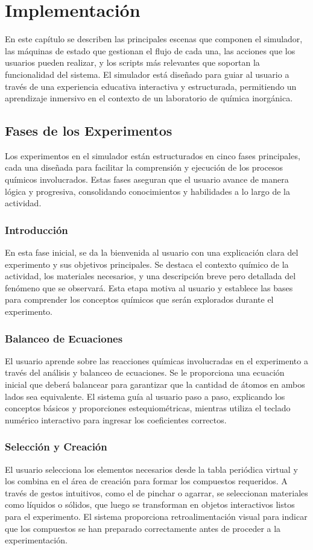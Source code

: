 \chapter{Implementación}\label{ch:Implementación}

En este capítulo se describen las principales escenas que componen el simulador, las máquinas de estado que gestionan el flujo de cada una, las acciones que los usuarios pueden realizar, y los scripts más relevantes que soportan la funcionalidad del sistema. El simulador está diseñado para guiar al usuario a través de una experiencia educativa interactiva y estructurada, permitiendo un aprendizaje inmersivo en el contexto de un laboratorio de química inorgánica.

\section{Fases de los Experimentos}
Los experimentos en el simulador están estructurados en cinco fases principales, cada una diseñada para facilitar la comprensión y ejecución de los procesos químicos involucrados. Estas fases aseguran que el usuario avance de manera lógica y progresiva, consolidando conocimientos y habilidades a lo largo de la actividad.

\subsection{Introducción}
En esta fase inicial, se da la bienvenida al usuario con una explicación clara del experimento y sus objetivos principales. Se destaca el contexto químico de la actividad, los materiales necesarios, y una descripción breve pero detallada del fenómeno que se observará. Esta etapa motiva al usuario y establece las bases para comprender los conceptos químicos que serán explorados durante el experimento.
\subsection{Balanceo de Ecuaciones}
El usuario aprende sobre las reacciones químicas involucradas en el experimento a través del análisis y balanceo de ecuaciones. Se le proporciona una ecuación inicial que deberá balancear para garantizar que la cantidad de átomos en ambos lados sea equivalente. El sistema guía al usuario paso a paso, explicando los conceptos básicos y proporciones estequiométricas, mientras utiliza el teclado numérico interactivo para ingresar los coeficientes correctos.
\subsection{Selección y Creación}
El usuario selecciona los elementos necesarios desde la tabla periódica virtual y los combina en el área de creación para formar los compuestos requeridos. A través de gestos intuitivos, como el de pinchar o agarrar, se seleccionan materiales como líquidos o sólidos, que luego se transforman en objetos interactivos listos para el experimento. El sistema proporciona retroalimentación visual para indicar que los compuestos se han preparado correctamente antes de proceder a la experimentación.
